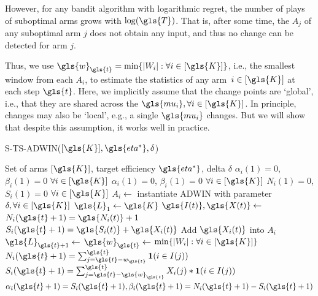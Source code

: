 However, for any bandit algorithm with logarithmic regret, the number of plays of suboptimal arms grows with $\log(\gls{T})$. 
That is, after some time, the $A_j$ of any suboptimal arm $j$ does not obtain any input, and thus no change can be detected for arm $j$. 

Thus, we use $\gls{w}_{\gls{t}} = \min\{|W_i|: \forall i \in [\gls{K}]\}$, i.e., the smallest window from each $A_i$, to estimate the statistics of any arm~$i \in [\gls{K}]$ at each step $\gls{t}$. 
Here, we implicitly assume that the change points are `global', i.e., that they are shared across the $\gls{mu_i}, \forall i \in [\gls{K}]$. In principle, changes may also be `local', e.g., a single $\gls{mu_i}$ changes. But we will show that despite this assumption, it works well in practice. %

\begin{algorithm} 
	\footnotesize
	\caption{\acrshort{S-TS-ADWIN}($[\gls{K}], \gls{eta^*}, \delta$)}\label{S-TS-ADWIN} 
	\begin{algorithmic}[1]
		\Require Set of arms
		$[\gls{K}]$, target efficiency $\gls{eta^*}$, delta $\delta$
		\State $\alpha_i(1) = 0$, $\beta_i(1) = 0$ \quad $\forall i \in [\gls{K}]$  
		\State $\alpha_i(1) = 0$, $\beta_i(1) = 0$ \quad $\forall i \in [\gls{K}]$ 
		\State $\textit{N}_i(1) = 0$, $\textit{S}_i(1) = 0$ \quad $\forall i \in [\gls{K}]$ 
		\State$A_i \gets $ instantiate \gls{ADWIN} with parameter $\delta, \forall i \in [\gls{K}]$ \label{line3} 
		\State $\gls{L}_1 \gets \gls{K}$ 
		\State $\gls{I(t)}, \gls{X(t)} \gets $  
		\State $N_i(\gls{t}+1) = \gls{N_i(t)} + 1$
		\State $S_i(\gls{t}+1) = \gls{S_i(t)} + \gls{X_i(t)}$
		\State\label{line10} Add $\gls{X_i(t)}$ into $A_i$
		\EndFor
		\State $\gls{L}_{\gls{t}+1} \gets$  
		\State\label{line11} $\gls{w}_{\gls{t}} \gets$ $ \min\{|W_i|: \forall i \in [\gls{K}]\}$ 
		\State $N_i(\gls{t}+1) = \sum_{j = \gls{t} - w_{\gls{t}}}^{\gls{t}} \Ind(i \in I(j))$ 
		\State $S_i(\gls{t}+1) = \sum_{j = \gls{t} - \gls{w}_{\gls{t}}}^{\gls{t}} X_i(j) * \Ind(i \in I(j))$ 
		\State $\alpha_i(\gls{t}+1) = S_i(\gls{t}+1), \beta_i(\gls{t}+1) =  N_i(\gls{t}+1) - S_i(\gls{t}+1)$ 
		\EndFor
	\end{algorithmic}
\end{algorithm}


